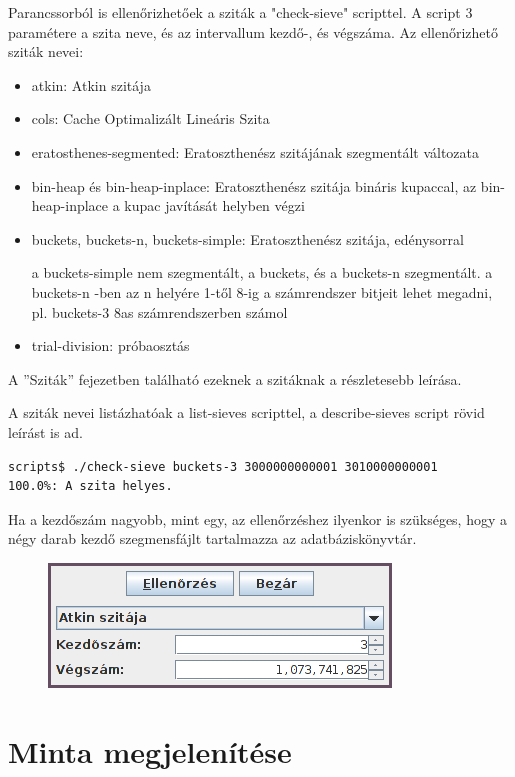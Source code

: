 Parancssorból is ellenőrizhetőek a sziták a "check-sieve" scripttel.
A script 3 paramétere a szita neve, és az intervallum kezdő-, és végszáma.
Az ellenőrizhető sziták nevei:

\begin{itemize}
\item atkin: Atkin szitája\cite{atkin}
\item cols: Cache Optimalizált Lineáris Szita
\item eratosthenes-segmented: Eratoszthenész szitájának szegmentált változata
\item bin-heap és bin-heap-inplace: Eratoszthenész szitája bináris kupaccal,
	az bin-heap-inplace a kupac javítását helyben végzi
\item buckets, buckets-n, buckets-simple: Eratoszthenész szitája, edénysorral

	a buckets-simple nem szegmentált, a buckets, és a buckets-n szegmentált.
	a buckets-n -ben az n helyére 1-től 8-ig a számrendszer bitjeit lehet megadni,
	pl. buckets-3 8as számrendszerben számol
\item trial-division: próbaosztás
\end{itemize}

A ''Sziták'' fejezetben található ezeknek a szitáknak a részletesebb leírása.

A sziták nevei listázhatóak a list-sieves scripttel, a describe-sieves script rövid leírást
is ad.

\begin{lstlisting}[language=bash]
scripts$ ./check-sieve buckets-3 3000000000001 3010000000001
100.0%: A szita helyes.
\end{lstlisting}

Ha a kezdőszám nagyobb, mint egy, az ellenőrzéshez ilyenkor is szükséges,
hogy a négy darab kezdő szegmensfájlt tartalmazza az adatbáziskönyvtár.

\begin{figure}[h]
\centering
\includegraphics[scale=1]{check-sieve.png}
\end{figure}

\section{Minta megjelenítése}

